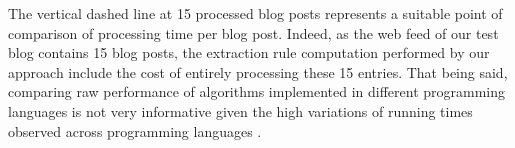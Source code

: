 The vertical dashed line at 15 processed blog posts represents a suitable point of comparison of processing time per blog post. Indeed, as the web feed of our test blog contains 15 blog posts, the extraction rule computation performed by our approach include the cost of entirely processing these 15 entries. That being said, comparing raw performance of algorithms implemented in different programming languages is not very informative given the high variations of running times observed across programming languages \cite{hundt2011}.
